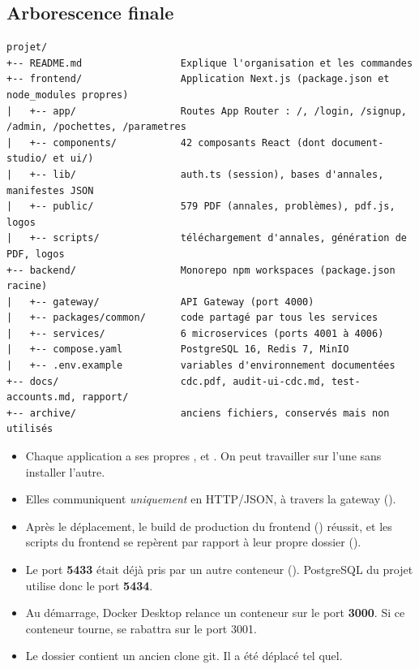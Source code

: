 \subsection{Arborescence finale}

\begin{lstlisting}[numbers=none,language={},caption={Arborescence de premier niveau}]
projet/
+-- README.md                 Explique l'organisation et les commandes
+-- frontend/                 Application Next.js (package.json et node_modules propres)
|   +-- app/                  Routes App Router : /, /login, /signup, /admin, /pochettes, /parametres
|   +-- components/           42 composants React (dont document-studio/ et ui/)
|   +-- lib/                  auth.ts (session), bases d'annales, manifestes JSON
|   +-- public/               579 PDF (annales, problèmes), pdf.js, logos
|   +-- scripts/              téléchargement d'annales, génération de PDF, logos
+-- backend/                  Monorepo npm workspaces (package.json racine)
|   +-- gateway/              API Gateway (port 4000)
|   +-- packages/common/      code partagé par tous les services
|   +-- services/             6 microservices (ports 4001 à 4006)
|   +-- compose.yaml          PostgreSQL 16, Redis 7, MinIO
|   +-- .env.example          variables d'environnement documentées
+-- docs/                     cdc.pdf, audit-ui-cdc.md, test-accounts.md, rapport/
+-- archive/                  anciens fichiers, conservés mais non utilisés
\end{lstlisting}

\begin{note}
\begin{itemize}
  \item Chaque application a ses propres ,  et . On peut travailler sur l'une sans installer l'autre.
  \item Elles communiquent \emph{uniquement} en HTTP/JSON, à travers la gateway ().
  \item Après le déplacement, le build de production du frontend () réussit, et les scripts du frontend se repèrent par rapport à leur propre dossier ().
\end{itemize}
\end{note}

\begin{alerte}
\begin{itemize}
  \item Le port \textbf{5433} était déjà pris par un autre conteneur (). PostgreSQL du projet utilise donc le port \textbf{5434}.
  \item Au démarrage, Docker Desktop relance un conteneur  sur le port \textbf{3000}. Si ce conteneur tourne,  se rabattra sur le port 3001.
  \item Le dossier  contient un ancien clone git. Il a été déplacé tel quel.
\end{itemize}
\end{alerte}
